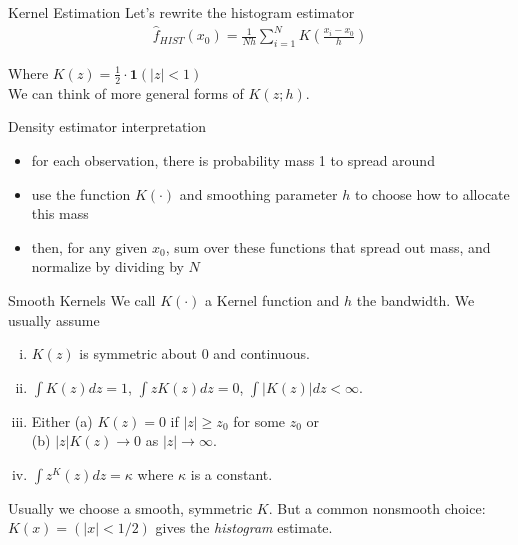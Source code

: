 \documentclass[11pt, aspectratio=169]{beamer}
\begin{document}

\begin{frame}{Kernel Estimation}
  Let's rewrite the histogram estimator
  \begin{eqnarray*}
    \hat{f}_{HIST}(x_0) = \frac{1}{Nh} \sum_{i=1}^N  K \left( \frac{x_i - x_0}{h} \right)
  \end{eqnarray*}

  Where $K(z) = \frac{1}{2} \cdot \mathbf{1} (|z| < 1) $\\[1em]

  We can think of more general forms of $K(z;h)$. 


\end{frame}

\begin{frame}{Density estimator interpretation}
  \begin{itemize}
    \item for each observation, there is probability mass 1 to spread around
    \item use the function $K(\cdot)$ and smoothing parameter $h$ to choose how to allocate this mass
    \item then, for any given $x_0$, sum over these functions that spread out mass, and normalize by dividing by $N$
  \end{itemize}
\end{frame}

\begin{frame}{Smooth Kernels}
  We call $K(\cdot)$ a \alert{Kernel function} and $h$ the \alert{bandwidth}. We usually assume
  \begin{enumerate}[(i)]
  \item $K(z)$ is symmetric about $0$ and continuous.
  \item $\int K(z) d z = 1$,  $\int z K(z) d z = 0$,  $\int |K(z)| d z < \infty$.
  \item Either (a) $K(z) = 0$ if $|z| \geq z_0$ for some $z_0$ or \\
  (b) $|z| K(z) \rightarrow 0$ as $|z| \rightarrow \infty$.
  \item $\int z^ K(z) d z = \kappa$ where $\kappa$ is a constant.
  \end{enumerate}

  \pause
  
  \bigskip

  Usually we choose a smooth, symmetric $K$. But a common nonsmooth choice: $K(x)=(|x|<1/2)$ gives the {\em histogram} estimate.

\end{frame}
 
\end{document}
